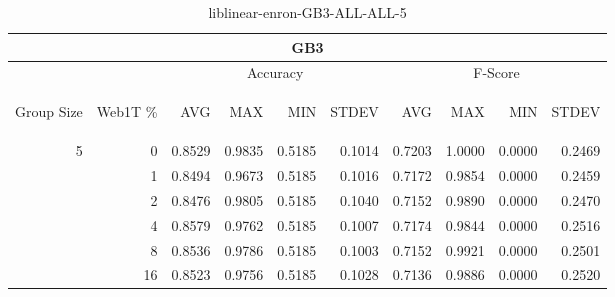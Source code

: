 \begin{center}
\begin{table}[htbp]
\begin{tabular}{ | r | r | r | r | r | r | r | r | r | r |}
\hline
\multicolumn{10}{|c|}{GB3}\\
\hline
 & & \multicolumn{4}{|c|}{Accuracy} & \multicolumn{4}{|c|}{F-Score}\\ \cline{3-10}
\begin{sideways}Group Size\end{sideways} & \begin{sideways}Web1T \%\end{sideways} & \begin{sideways}AVG\end{sideways} & \begin{sideways}MAX\end{sideways} & \begin{sideways}MIN\end{sideways} & \begin{sideways}STDEV\end{sideways} & \begin{sideways}AVG\end{sideways} & \begin{sideways}MAX\end{sideways} & \begin{sideways}MIN\end{sideways} & \begin{sideways}STDEV\end{sideways}\\
\hline
\multirow{5}{*}{5}
 & 0 & 0.8529 & 0.9835 & 0.5185 & 0.1014 & 0.7203 & 1.0000 & 0.0000 & 0.2469\\ \cline{2-10}
 & 1 & 0.8494 & 0.9673 & 0.5185 & 0.1016 & 0.7172 & 0.9854 & 0.0000 & 0.2459\\ \cline{2-10}
 & 2 & 0.8476 & 0.9805 & 0.5185 & 0.1040 & 0.7152 & 0.9890 & 0.0000 & 0.2470\\ \cline{2-10}
 & 4 & 0.8579 & 0.9762 & 0.5185 & 0.1007 & 0.7174 & 0.9844 & 0.0000 & 0.2516\\ \cline{2-10}
 & 8 & 0.8536 & 0.9786 & 0.5185 & 0.1003 & 0.7152 & 0.9921 & 0.0000 & 0.2501\\ \cline{2-10}
 & 16 & 0.8523 & 0.9756 & 0.5185 & 0.1028 & 0.7136 & 0.9886 & 0.0000 & 0.2520\\ \cline{2-10}
\hline
\end{tabular}
\caption{liblinear-enron-GB3-ALL-ALL-5}
\label{table:liblinear-enron-GB3-ALL-ALL-5}
\end{table}
\end{center}

